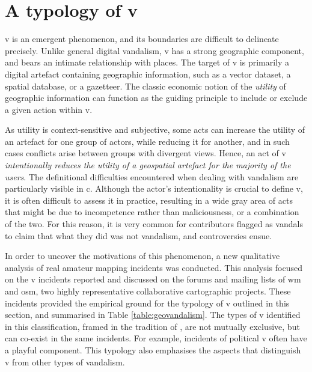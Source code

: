 \documentclass{article} \usepackage{graphicx,xspace}
\begin{document}
\section{A typology of \protect\gls{v}}
\label{sec:classif}


\Gls{v} is an emergent phenomenon, and its boundaries are difficult to delineate precisely.
Unlike general digital vandalism, \gls{v} has a strong geographic component, and bears an intimate relationship with places.
The target of \gls{v} is primarily a digital artefact containing geographic information, such as a vector dataset, a spatial database, or a gazetteer.
The classic economic notion of the \emph{utility} of geographic information can function as the guiding principle to include or exclude a given action within \gls{v}.

As utility is context-sensitive and subjective, some acts can increase the utility of an artefact for one group of actors, while reducing it for another, and in such cases conflicts arise between groups with divergent views.
Hence, an act of \gls{v} \emph{intentionally reduces the utility of a geospatial artefact for the majority of the users}.
The definitional difficulties encountered when dealing with vandalism are particularly visible in \gls{c}.
Although the actor's intentionality is crucial to define \gls{v}, it is often difficult to assess it in practice, resulting in a wide gray area of acts that might be due to incompetence rather than maliciousness, or a combination of the two.
For this reason, it is very common for contributors flagged as vandals to claim that what they did was not vandalism, and controversies ensue.

In order to uncover the motivations of this phenomenon, a new qualitative analysis of real amateur mapping incidents was conducted.
This analysis focused on the \gls{v} incidents reported and discussed on the forums and mailing lists of \gls{wm} and \gls{osm}, two highly representative collaborative cartographic projects.
These incidents provided the empirical ground for the typology of \gls{v} outlined in this section, and summarised in Table \ref{table:geovandalism}.
The types of \gls{v} identified in this classification, framed in the tradition of \cite{cohen:1973:property}, are not mutually exclusive, but can co-exist in the same incidents.
For example, incidents of political \gls{v} often have a playful component.
This typology also emphasises the aspects that distinguish \gls{v} from other types of vandalism.
\end{document}
